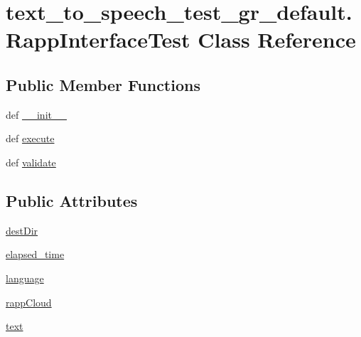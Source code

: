 \hypertarget{classtext__to__speech__test__gr__default_1_1RappInterfaceTest}{\section{text\-\_\-to\-\_\-speech\-\_\-test\-\_\-gr\-\_\-default.\-Rapp\-Interface\-Test Class Reference}
\label{classtext__to__speech__test__gr__default_1_1RappInterfaceTest}
}
\subsection*{Public Member Functions}
\begin{DoxyCompactItemize}
\item 
def \hyperlink{classtext__to__speech__test__gr__default_1_1RappInterfaceTest_aba5548b69bda6939a96dfcafa5407ffb}{\-\_\-\-\_\-init\-\_\-\-\_\-}
\item 
def \hyperlink{classtext__to__speech__test__gr__default_1_1RappInterfaceTest_a86492b0fc79e31ed65a9eaf6116fdac0}{execute}
\item 
def \hyperlink{classtext__to__speech__test__gr__default_1_1RappInterfaceTest_a9a12611d7180b374f311bd75f1b599a4}{validate}
\end{DoxyCompactItemize}
\subsection*{Public Attributes}
\begin{DoxyCompactItemize}
\item 
\hyperlink{classtext__to__speech__test__gr__default_1_1RappInterfaceTest_ab1f26587cf685de7e11e166ea12b2516}{dest\-Dir}
\item 
\hyperlink{classtext__to__speech__test__gr__default_1_1RappInterfaceTest_a2fc20be9af4aa16d689dda5fc1d51a4d}{elapsed\-\_\-time}
\item 
\hyperlink{classtext__to__speech__test__gr__default_1_1RappInterfaceTest_a82dde6c74428e2bb21bcad88dc11aed4}{language}
\item 
\hyperlink{classtext__to__speech__test__gr__default_1_1RappInterfaceTest_a22188d5c5d1e548f7b4fb0e9e62408c6}{rapp\-Cloud}
\item 
\hyperlink{classtext__to__speech__test__gr__default_1_1RappInterfaceTest_a2cdfe9a0733031bc888b05dc9b6f7c56}{text}
\end{DoxyCompactItemize}


